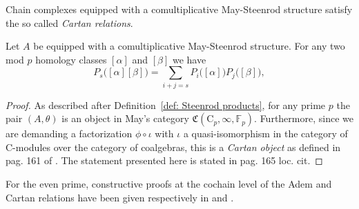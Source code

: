 Chain complexes equipped with a comultiplicative May-Steenrod structure satisfy the so called \textit{Cartan relations}.

\begin{lemma}
	Let $A$ be equipped with a comultiplicative May-Steenrod structure.
	For any two mod $p$ homology classes $[\alpha]$ and $[\beta]$ we have
	\begin{equation*}
	P_s\big([\alpha] [\beta]\big) = \sum_{i+j=s} P_i\big( [\alpha] \big) P_j\big( [\beta] \big),
	\end{equation*}
\end{lemma}

\begin{proof}
	As described after Definition~\ref{def: Steenrod products}, for any prime $p$ the pair $(A, \theta)$ is an object in May's category $\mathfrak{C}(\mathrm C_p, \infty, \mathbb{F}_p)$.
	Furthermore, since we are demanding a factorization $\phi \circ \iota$ with $\iota$ a quasi-isomorphism in the category of $\mathrm{C}$-modules over the category of coalgebras, this is a \textit{Cartan object} as defined in pag. 161 of \cite{may70generalapproach}.
	The statement presented here is stated in pag. 165 loc. cit.
\end{proof}

For the even prime, constructive proofs at the cochain level of the Adem and Cartan relations have been given respectively in \cite{brumfiel2020cochain} and \cite{medina2020cartan}.